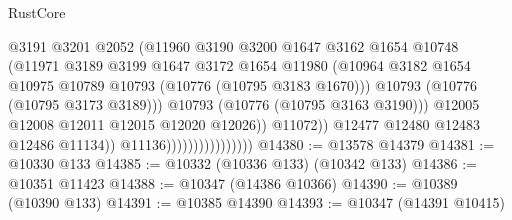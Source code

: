 \begin{lexlean}{RustCore}
\begin{coremodule}
                                                @3191
                                                @3201
                                                @2052
                                                (@11960
                                                  @3190
                                                  @3200
                                                  @1647
                                                  @3162
                                                  @1654
                                                  @10748
                                                  (@11971
                                                    @3189
                                                    @3199
                                                    @1647
                                                    @3172
                                                    @1654
                                                    @11980
                                                    (@10964
                                                      @3182
                                                      @1654
                                                      @10975
                                                      @10789
                                                      @10793
                                                      (@10776 (@10795 @3183 @1670)))
                                                    @10793
                                                    (@10776 (@10795 @3173 @3189)))
                                                  @10793
                                                  (@10776 (@10795 @3163 @3190)))
                                                @12005
                                                @12008
                                                @12011
                                                @12015
                                                @12020
                                                @12026))
                                            @11072))
                                        @12477
                                        @12480
                                        @12483
                                        @12486
                                        @11134))
                                    @11136))))))))))))))))
@14380 := @13578 @14379
@14381 := @10330 @133
@14385 := @10332 (@10336 @133) (@10342 @133)
@14386 := @10351 @11423
@14388 := @10347 (@14386 @10366)
@14390 := @10389 (@10390 @133)
@14391 := @10385 @14390
@14393 := @10347 (@14391 @10415)

\end{coremodule}
\end{lexlean}

